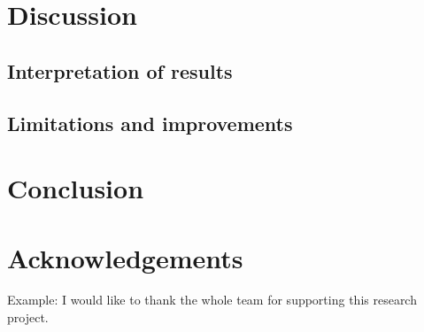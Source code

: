 \documentclass[12pt]{article}
\begin{document}
\section{Discussion}
\subsection{Interpretation of results}
\subsection{Limitations and improvements}


% 
% 
\section{Conclusion}



% 
% 
\section*{Acknowledgements}
Example: I would like to thank the whole team for supporting this research project.



% 
% 
\newpage


% 



\end{document}
